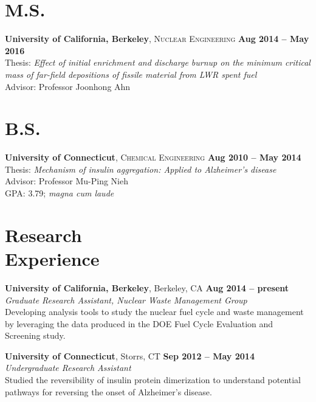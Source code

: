 \documentclass[margin,line]{resume}
\begin{document}
\begin{resume}
    
    
\section{\mysidestyle M.S.}
    \textbf{University of California, Berkeley}, 
    \textsc{Nuclear Engineering} \hfill 
    \textbf{Aug 2014 -- May 2016} \vspace{1mm} \\
    Thesis: \textsl{Effect of initial enrichment and discharge burnup on the minimum critical mass of far-field depositions of fissile material from LWR spent fuel} \\
    Advisor: Professor Joonhong Ahn \\

\section{\mysidestyle B.S.}
    \textbf{University of Connecticut}, 
    \textsc{Chemical Engineering} \hfill 
    \textbf{Aug 2010 -- May 2014} \vspace{1 mm} \\
    Thesis: \textsl{Mechanism of insulin aggregation: Applied to Alzheimer’s disease} \\
    Advisor: Professor Mu-Ping Nieh \\
    GPA: 3.79; \textsl{magna cum laude} \\


\section{\mysidestyle Research \\ Experience}

\textbf{University of California, Berkeley}, Berkeley, CA \hfill 
    \textbf{Aug 2014 -- present } \\
\textsl{Graduate Research Assistant, Nuclear Waste Management Group} \\
Developing analysis tools to study the nuclear fuel cycle and waste management by leveraging the data produced in the DOE Fuel Cycle Evaluation and Screening study.

\textbf{University of Connecticut}, Storrs, CT \hfill 
    \textbf{Sep 2012 -- May 2014} \\
\textsl{Undergraduate Research Assistant} \\
Studied the reversibility of insulin protein dimerization to understand potential pathways for reversing the onset of Alzheimer's disease.


\end{resume}
\end{document}
